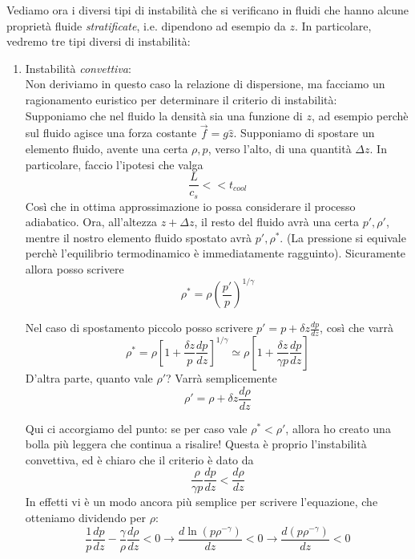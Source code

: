 \documentclass{report}
\begin{document}
Vediamo ora i diversi tipi di instabilità che si verificano in fluidi che hanno alcune proprietà fluide \emph{stratificate}, i.e. dipendono ad esempio da $z$. In particolare, vedremo tre tipi diversi di instabilità: 

\begin{enumerate}
    \item Instabilità \emph{convettiva}: \\
    Non deriviamo in questo caso la relazione di dispersione, ma facciamo un ragionamento euristico per determinare il criterio di instabilità: \\

    Supponiamo che nel fluido la densità sia una funzione di $z$, ad esempio perchè sul fluido agisce una forza costante $\vec{f} = g\hat{z}$. Supponiamo di spostare un elemento fluido, avente una certa $\rho, p$, verso l'alto, di una quantità $\Delta z$. In particolare, faccio l'ipotesi che valga
    \begin{equation}
        \frac{L}{c_s} << t_{cool}
    \end{equation}
    Così che in ottima approssimazione io possa considerare il processo adiabatico. Ora, all'altezza $z+\Delta z$, il resto del fluido avrà una certa $p', \rho'$, mentre il nostro elemento fluido spostato avrà $p', \rho^*$. (La pressione si equivale perchè l'equilibrio termodinamico è immediatamente ragguinto). Sicuramente allora posso scrivere 
    \begin{equation}
        \rho^* = \rho \left(\frac{p'}{p} \right)^{1/\gamma}
    \end{equation}

    Nel caso di spostamento piccolo posso scrivere $p' = p + \delta z \frac{dp}{dz}$, così che varrà 
    \begin{equation}
        \rho^* = \rho \left[1 + \frac{\delta z}{p}\frac{dp}{dz}\right]^{1/\gamma} \simeq \rho \left[1 + \frac{\delta z}{\gamma p}\frac{dp}{dz}\right]
    \end{equation}
    D'altra parte, quanto vale $\rho'$? Varrà semplicemente 
    \begin{equation}
        \rho' = \rho + \delta z \frac{d\rho}{dz}
    \end{equation}

    Qui ci accorgiamo del punto: se per caso vale $\rho^* < \rho'$, allora ho creato una bolla più leggera che continua a risalire! Questa è proprio l'instabilità convettiva, ed è chiaro che il criterio è dato da 
    \begin{equation}
        \frac{\rho}{\gamma p}\frac{dp}{dz} < \frac{d\rho}{dz}
    \end{equation}
    In effetti vi è un modo ancora più semplice per scrivere l'equazione, che otteniamo dividendo per $\rho$:
    \begin{equation}
        \frac{1}{p}\frac{dp}{dz} - \frac{\gamma}{\rho}\frac{d\rho}{dz} < 0 \rightarrow \frac{d\ln (p\rho^{-\gamma})}{dz} <0 \rightarrow \frac{d(p\rho^{-\gamma})}{dz} < 0 
    \end{equation}


\end{enumerate}
\end{document}
